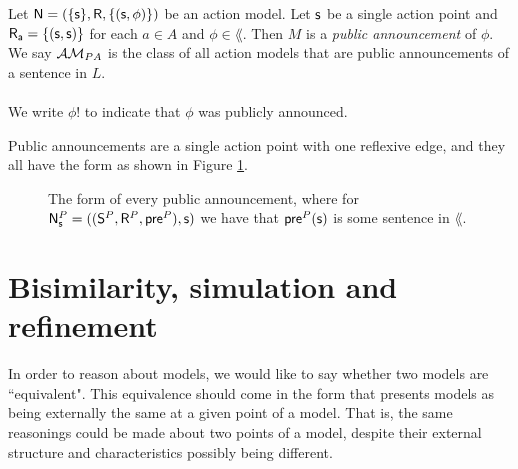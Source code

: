 \begin{defn} \label{pub}
Let $\mathrm{\mathsf{\mathrm{\mathsf{N}} = (\{ s \}, R, \{ (s, \phi)\}}})$ be an action model.
Let $\mathrm{\mathsf{s}}$ be a single action point and $\mathrm{\mathsf{R_a = \{(s, s)\}}}$ for each $a \in A$ and $\phi
\in \lang$.
Then $M$ is a {\em public announcement} of $\phi$.
We say $\mathcal{AM}_{PA}$ is the class of all action models that
are public announcements of a sentence in $L$.\\
\\
We write $\phi!$ to indicate that $\phi$ was publicly announced.
\end{defn}

Public announcements are a single action point with one reflexive edge, and they all have the form
as shown in Figure \ref{figure:exampleAnnounce}.

\begin{figure}
\centering
{}
\caption[Public announcement form]{The form of every public announcement, where for $\mathrm{\mathsf{N}}^P_\mathrm{\mathsf{s}} =
((\mathrm{\mathsf{S}}^P,\mathrm{\mathsf{R}}^P,\mathrm{\mathsf{pre}}^P),\mathrm{\mathsf{s}})$ we have that $\mathrm{\mathsf{pre}}^P(\mathrm{\mathsf{s}})$ is some sentence in $\lang$.}
\label{figure:exampleAnnounce}
\end{figure}

\section{Bisimilarity, simulation and refinement} \label{subsec:prelim:bisimulation}

In order to reason about models, we would like to say whether two models are ``equivalent".
This equivalence should come in the form that presents models as being externally the same at a
given point of a model.
That is, the same reasonings could be made about two points of a model, despite their external
structure and characteristics possibly being different.


